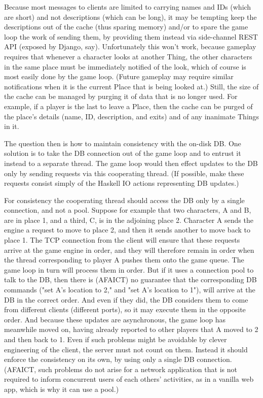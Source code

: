 Because most messages to clients are limited to carrying names and IDs
(which are short) and not descriptions (which can be long), it may be tempting
keep the descriptions out of the cache (thus sparing memory) and/or to spare the
game loop the work of sending them, by providing them instead via side-channel
REST API (exposed by Django, say). Unfortunately this won't work, because
gameplay requires that whenever a character looks at another Thing, the other
characters in the same place must be immediately notified of the look, which
of course is most easily done by the game loop.
(Future gameplay may require similar notifications when
it is the current Place that is being looked at.) Still, the size of the cache
can be managed by purging it of data that is no longer used. For example, if
a player is the last to leave a Place, then the cache can be purged of the
place's details (name, ID, description, and exits) and of any inanimate Things
in it.

The question then is how to maintain consistency with the on-disk DB. One
solution is to take the DB connection out of the game loop and to entrust
it instead to a separate thread. The game loop would then effect updates
to the DB only by sending requests via this cooperating thread. (If possible,
make these requests consist simply of the Haskell IO actions representing DB
updates.)

For consistency the cooperating thread should access the DB only
by a single connection, and not a pool. Suppose for example that two
characters, A and B, are in place 1, and a third, C, is in the adjoining
place 2. Character A sends the engine a request to move to place 2, and then
it sends another to move back to place 1. The TCP connection from the client
will ensure that these requests arrive at the game engine in order, and they
will therefore remain in order when the thread corresponding to player A pushes
them onto the game queue. The game loop in turn will process them in order.
But if it uses a connection pool to talk to the DB, then there is (AFAICT)
no guarantee that the corresponding DB commands ("set A's location to 2," and
"set A's location to 1"), will arrive at the DB in the correct order. And even
if they did, the DB considers them to come from different clients (different
ports), so it may execute them in the opposite order. And because these
updates are asynchronous, the game loop has meanwhile moved on, having already
reported to other players that A moved to 2 and then back to 1. Even if such
problems might be avoidable by clever engineering of the client, the server
must not count on them. Instead it should enforce the consistency on its own,
by using only a single DB connection. (AFAICT,
such problems do not arise for a network application that is not required to
inform concurrent users of each others' activities, as in a vanilla web app,
which is why it can use a pool.)
